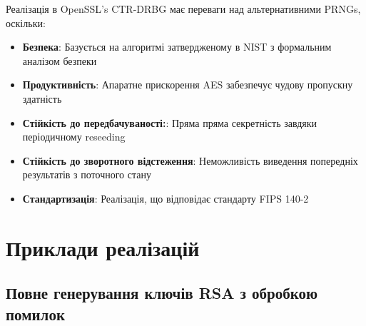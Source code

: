 Реалізація в OpenSSL's CTR-DRBG має переваги над альтернативними PRNGs, оскільки:
\begin{itemize}
    \item \textbf{Безпека}: Базується на алгоритмі затвердженому в NIST з формальним аналізом безпеки
    \item \textbf{Продуктивність}: Апаратне прискорення AES забезпечує чудову пропускну здатність
    \item \textbf{Стійкість до передбачуваності:}: Пряма пряма секретність завдяки періодичному reseeding
    \item \textbf{Стійкість до зворотного відстеження}: Неможливість виведення попередніх результатів з поточного стану
    \item \textbf{Стандартизація}: Реалізація, що відповідає стандарту FIPS 140-2
\end{itemize}

\section{Приклади реалізацій}

\subsection{Повне генерування ключів RSA з обробкою помилок}

